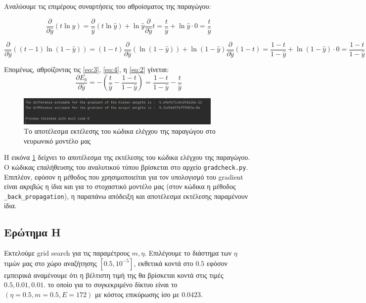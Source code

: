 \documentclass{article}
\newcommand{\code}{\texttt}
\begin{document}
Αναλύουμε τις επιμέρους συναρτήσεις του αθροίσματος της παραγώγου:

\begin{equation}
	\label{eq:3}
	\frac{\partial}{\partial \hat{y}} (t \ln\hat{y}) = \frac{\partial }{\hat{y}} (t\ln\hat{y}) + \ln\hat{y} \frac{\partial}{\partial \hat{y}}t = \frac{t}{\hat{y}} + \ln \hat{y} \cdot 0 = \frac{t}{\hat{y}}
\end{equation}

\begin{equation}
	\label{eq:4}
	\frac{\partial}{\partial \hat{y}} ((t-1) \ln(1-\hat{y})) = (1-t)\frac{\partial}{\partial\hat{y}} (\ln(1-\hat{y})) + \ln(1-\hat{y}) \frac{\partial}{\partial \hat{y}}(1-t) = \frac{1-t}{1-\hat{y}} + \ln(1-\hat{y}) \cdot 0 =\frac{1-t}{1-\hat{y}}
\end{equation}


Επομένως, αθροίζοντας τις \ref{eq:3}, \ref{eq:4}, η \ref{eq:2} γίνεται:
\begin{equation}
	\frac{\partial E_b}{\partial \hat{y}} = - (\frac{t}{\hat{y}} - \frac{1-t}{1-\hat{y}}) = \frac{1-t}{1 - \hat{y}} - \frac{t}{\hat{y}}
\end{equation}

\begin{figure}
	\includegraphics[width=10cm]{gradcheck.png}
	\centering
	\caption{Το αποτέλεσμα εκτέλεσης του κώδικα ελέγχου της παραγώγου στο νευρωνικό μοντέλο μας}
	\label{gradcheck}
\end{figure}

Η εικόνα \ref{gradcheck} δείχνει το αποτέλεσμα της εκτέλεσης του κώδικα ελέγχου της παραγώγου. Ο κώδικας επαλήθευσης του αναλυτικού τύπου βρίσκεται στο αρχείο \code{gradcheck.py}. Επιπλέον, εφόσον η μέθοδος που χρησιμοποιείται για τον υπολογισμό του gradient είναι \textit{ακριβώς} η ίδια και για το στοχαστικό μοντέλο μας (στον κώδικα η μέθοδος \code{\_back\_propagation}), η παραπάνω απόδειξη και αποτέλεσμα εκτέλεσης παραμένουν ίδια.


\subsection{Ερώτημα Η}

Εκτελούμε grid search για τις παραμέτρους $m, \eta$. Επιλέγουμε το διάστημα των $\eta$ τιμών μας στο χώρο αναζήτησης $[0.5, 10^{-5}]$, εκθετικά κοντά στο $0.5$ εφόσον εμπειρικά αναμένουμε ότι η βέλτιστη τιμή της θα βρίσκεται κοντά στις τιμές $0.5, 0.01, 0.01$.  το οποίο για το συγκεκριμένο δίκτυο είναι το $(\eta=0.5, m=0.5, E=172)$ με κόστος επικύρωσης ίσο με $0.0423$.
\end{document}
